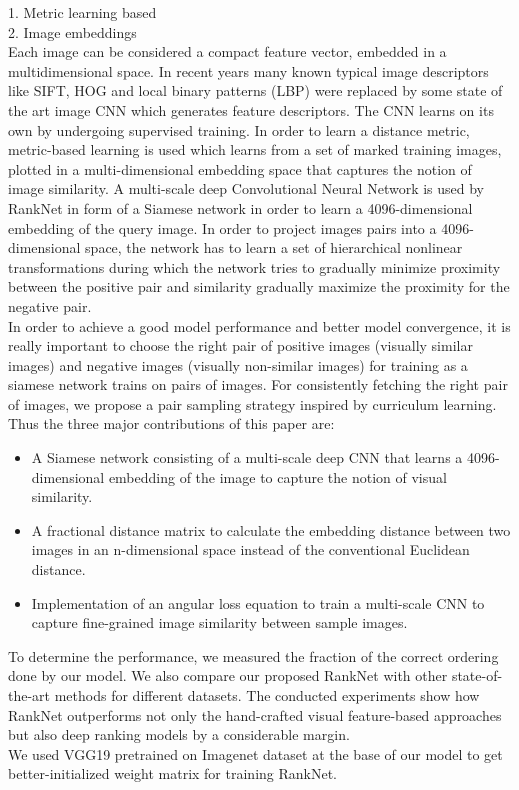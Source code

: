 \documentclass[10pt,twocolumn,letterpaper]{article}
\begin{document}
1. Metric learning based \\
2. Image embeddings \\
Each image can be considered a compact feature vector, embedded in a multidimensional space. In recent years many known typical image descriptors like SIFT, HOG and local binary patterns (LBP) \cite{c48} were replaced by some state of the art image CNN which generates feature descriptors. The CNN learns on its own by undergoing supervised training. In order to learn a distance metric, metric-based learning is used which learns from a set of marked training images, plotted in a multi-dimensional embedding space that captures the notion of image similarity. A multi-scale deep Convolutional Neural Network is used by RankNet in form of a Siamese network in order to learn a 4096-dimensional embedding of the query image. In order to project images pairs into a 4096-dimensional space, the network has to learn a set of hierarchical nonlinear transformations during which the network tries to gradually minimize proximity between the positive pair and similarity gradually maximize the proximity for the negative pair. \\
In order to achieve a good model performance and better model convergence, it is really important to choose the right pair of positive images (visually similar images) and negative images (visually non-similar images) for training as a siamese network trains on pairs of images. For consistently fetching the right pair of images, we propose a pair sampling strategy inspired by curriculum learning.
Thus the three major contributions of this paper are:
\vspace{-2mm}
\begin{itemize}
\item A Siamese network consisting of a multi-scale deep CNN that learns a 4096-dimensional embedding of the image to capture the notion of visual similarity. 
\item A fractional distance matrix to calculate the embedding distance between two images in an n-dimensional space instead of the conventional Euclidean distance. 
\item Implementation of an angular loss equation to train a multi-scale CNN to capture fine-grained image similarity between sample images.
\end{itemize}

To determine the performance, we measured the fraction of the correct ordering done by our model. We also compare our proposed RankNet with other state-of-the-art methods for different datasets. The conducted experiments show how RankNet outperforms not only the hand-crafted visual feature-based approaches but also deep ranking models by a considerable margin. \\
We used VGG19 pretrained on Imagenet dataset at the base of our model to get better-initialized weight matrix for training RankNet.
\end{document}
